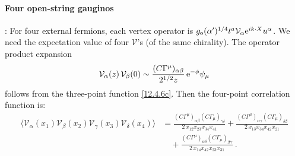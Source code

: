 \paragraph*{Four open-string gauginos}: For four external fermions, each vertex operator is $g_{\mathrm{o}}(\alpha')^{1/4} t^a \mathcal{V}_\alpha \mathrm{e}^{i k\cdot X} u^\alpha$. We need the expectation value of four $\mathcal{V}$'s (of the same chirality). The operator product expansion
\begin{equation}
	\mathcal{V}_\alpha(z)\,\mathcal{V}_\beta(0) \sim \frac{(C\Gamma^\mu)_{\alpha\beta}}{2^{1/2} z}\,\mathrm{e}^{-\phi}\psi_\mu \label{12.4.18}
\end{equation}
follows from the three-point function \eqref{12.4.6c}. Then the four-point correlation function is:
\begin{align}
	\langle \mathcal{V}_{\alpha}(x_{1})\mathcal{V}_{\beta}(x_{2})\mathcal{V}_{\gamma}(x_{3})\mathcal{V}_{\delta}(x_{4})\rangle &= \frac{(C\Gamma^{\mu})_{\alpha\beta}(C\Gamma_{\mu})_{\gamma\delta}}{2\,x_{12}x_{23}x_{34}x_{41}} + \frac{(C\Gamma^{\mu})_{\alpha\gamma}(C\Gamma_{\mu})_{\delta\beta}}{2\,x_{13}x_{34}x_{42}x_{21}} \nonumber \\
	&\quad + \frac{(C\Gamma^{\mu})_{\alpha\delta}(C\Gamma_{\mu})_{\beta\gamma}}{2\,x_{14}x_{42}x_{23}x_{31}} \:. \label{12.4.19}
\end{align}
